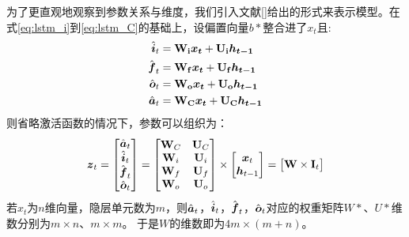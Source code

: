 为了更直观地观察到参数关系与维度，我们引入文献[]给出的形式来表示模型。在式\ref{eq:lstm_i}到\ref{eq:lstm_C}的基础上，设偏置向量$b*$整合进了$x_t$且:
\begin{align}
    \hat{\boldsymbol{i}}_t &= \boldsymbol{\mathbf{W_i}}\boldsymbol{x_t} + \boldsymbol{\mathbf{U_i}}\boldsymbol{h_{t-1}}\\
    \hat{\boldsymbol{f}}_t &= \boldsymbol{\mathbf{W_f}}\boldsymbol{x_t} + \boldsymbol{\mathbf{U_f}}\boldsymbol{h_{t-1}}\\
    \hat{\boldsymbol{o}}_t &= \boldsymbol{\mathbf{W_o}}\boldsymbol{x_t} + \boldsymbol{\mathbf{U_o}}\boldsymbol{h_{t-1}}\\
    \hat{\boldsymbol{a}}_t &= \boldsymbol{\mathbf{W_C}}\boldsymbol{x_t} + \boldsymbol{\mathbf{U_C}}\boldsymbol{h_{t-1}}
\end{align}
则省略激活函数的情况下，参数可以组织为：
\begin{equation}
    \boldsymbol{z}_t =
    \begin{bmatrix}
        \hat{\boldsymbol{a}}_t\\
        \hat{\boldsymbol{i}}_t\\
        \hat{\boldsymbol{f}}_t\\
        \hat{\boldsymbol{o}}_t\\
    \end{bmatrix}
    =
    \begin{bmatrix}
        \boldsymbol{\mathbf{W}}_C & \boldsymbol{\mathbf{U}}_C\\
        \boldsymbol{\mathbf{W}}_i & \boldsymbol{\mathbf{U}}_i\\
        \boldsymbol{\mathbf{W}}_f & \boldsymbol{\mathbf{U}}_f\\
        \boldsymbol{\mathbf{W}}_o & \boldsymbol{\mathbf{U}}_o\\
    \end{bmatrix}
    \times
    \begin{bmatrix}
        \boldsymbol{x}_t\\
        \boldsymbol{h}_{t-1}
    \end{bmatrix}
    =
    \begin{bmatrix}
        \boldsymbol{\mathbf{W}}\times\boldsymbol{\mathbf{I}}_t
    \end{bmatrix}
\end{equation}
若$x_t$为$n$维向量，隐层单元数为$m$，则$\hat{\boldsymbol{a}}_t$，$\hat{\boldsymbol{i}}_t$，$\hat{\boldsymbol{f}}_t$，$\hat{\boldsymbol{o}}_t$对应的权重矩阵$W*$、$U*$维数分别为$m\times n$、$m\times m$。
于是$W$的维数即为$4m\times(m+n)$。

